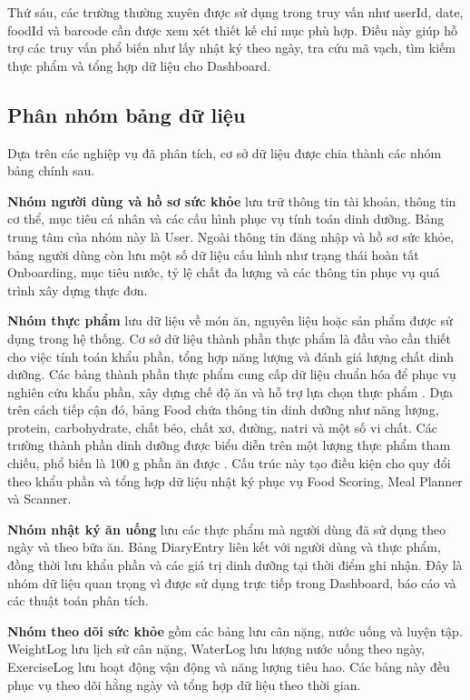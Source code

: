 \documentclass[12pt, a4paper]{report}
\begin{document}
Thứ sáu, các trường thường xuyên được sử dụng trong truy vấn như userId, date, foodId và barcode cần được xem xét thiết kế chỉ mục phù hợp. Điều này giúp hỗ trợ các truy vấn phổ biến như lấy nhật ký theo ngày, tra cứu mã vạch, tìm kiếm thực phẩm và tổng hợp dữ liệu cho Dashboard.

\subsection{Phân nhóm bảng dữ liệu}Dựa trên các nghiệp vụ đã phân tích, cơ sở dữ liệu được chia thành các nhóm bảng chính sau.

\textbf{Nhóm người dùng và hồ sơ sức khỏe} lưu trữ thông tin tài khoản, thông tin cơ thể, mục tiêu cá nhân và các cấu hình phục vụ tính toán dinh dưỡng. Bảng trung tâm của nhóm này là User. Ngoài thông tin đăng nhập và hồ sơ sức khỏe, bảng người dùng còn lưu một số dữ liệu cấu hình như trạng thái hoàn tất Onboarding, mục tiêu nước, tỷ lệ chất đa lượng và các thông tin phục vụ quá trình xây dựng thực đơn.

\textbf{Nhóm thực phẩm} lưu dữ liệu về món ăn, nguyên liệu hoặc sản phẩm được sử dụng trong hệ thống. Cơ sở dữ liệu thành phần thực phẩm là đầu vào cần thiết cho việc tính toán khẩu phần, tổng hợp năng lượng và đánh giá lượng chất dinh dưỡng. Các bảng thành phần thực phẩm cung cấp dữ liệu chuẩn hóa để phục vụ nghiên cứu khẩu phần, xây dựng chế độ ăn và hỗ trợ lựa chọn thực phẩm \cite{vien_dinh_duong_2007}. Dựa trên cách tiếp cận đó, bảng Food chứa thông tin dinh dưỡng như năng lượng, protein, carbohydrate, chất béo, chất xơ, đường, natri và một số vi chất. Các trường thành phần dinh dưỡng được biểu diễn trên một lượng thực phẩm tham chiếu, phổ biến là 100 g phần ăn được \cite{vien_dinh_duong_2007}. Cấu trúc này tạo điều kiện cho quy đổi theo khẩu phần và tổng hợp dữ liệu nhật ký phục vụ Food Scoring, Meal Planner và Scanner.

\textbf{Nhóm nhật ký ăn uống} lưu các thực phẩm mà người dùng đã sử dụng theo ngày và theo bữa ăn. Bảng DiaryEntry liên kết với người dùng và thực phẩm, đồng thời lưu khẩu phần và các giá trị dinh dưỡng tại thời điểm ghi nhận. Đây là nhóm dữ liệu quan trọng vì được sử dụng trực tiếp trong Dashboard, báo cáo và các thuật toán phân tích.

\textbf{Nhóm theo dõi sức khỏe} gồm các bảng lưu cân nặng, nước uống và luyện tập. WeightLog lưu lịch sử cân nặng, WaterLog lưu lượng nước uống theo ngày, ExerciseLog lưu hoạt động vận động và năng lượng tiêu hao. Các bảng này đều phục vụ theo dõi hằng ngày và tổng hợp dữ liệu theo thời gian.
\end{document}
